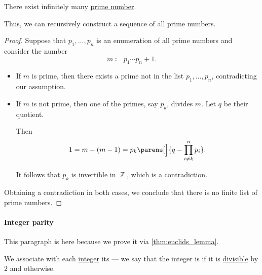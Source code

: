 \begin{theorem}\label{thm:euclids_prime_infinitude_theorem}
  There exist infinitely many \hyperref[def:prime_number]{prime number}.
\end{theorem}
\begin{comments}
  \item Thus, we can recursively construct a sequence of all prime numbers.
\end{comments}
\begin{proof}
  Suppose that \( p_1, \ldots, p_n \) is an enumeration of all prime numbers and consider the number
  \begin{equation*}
    m \coloneqq p_1 \cdots p_n + 1.
  \end{equation*}

  \begin{itemize}
    \item If \( m \) is prime, then there exists a prime not in the list \( p_1, \ldots, p_n \), contradicting our assumption.

    \item If \( m \) is not prime, then one of the primes, say \( p_k \), divides \( m \). Let \( q \) be their quotient.

    Then
    \begin{equation*}
      1 = m - (m - 1) = p_k \parens[\Big]{ q - \prod_{i \neq k}^n p_i }.
    \end{equation*}

    It follows that \( p_k \) is invertible in \( \BbbZ \), which is a contradiction.
  \end{itemize}

  Obtaining a contradiction in both cases, we conclude that there is no finite list of prime numbers.
\end{proof}

\paragraph{Integer parity}

This paragraph is here because we prove it via \cref{thm:euclids_lemma}.

\begin{definition}\label{def:integer_parity}\mimprovised
  We associate with each \hyperref[def:integers]{integer} its  --- we say that the integer is  if it is \hyperref[def:divisibility]{divisible} by \( 2 \) and  otherwise.
\end{definition}

